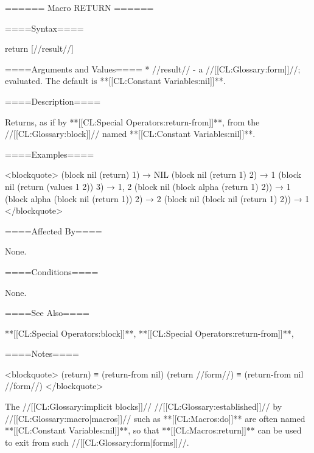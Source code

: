 ====== Macro RETURN ======

====Syntax====

\DefmacNoReturn return {[//result//]}

====Arguments and Values====
  * //result// - a //[[CL:Glossary:form]]//; evaluated. The default is **[[CL:Constant Variables:nil]]**.

====Description====

Returns, as if by **[[CL:Special Operators:return-from]]**, from the //[[CL:Glossary:block]]// named **[[CL:Constant Variables:nil]]**.

====Examples====

<blockquote> (block nil (return) 1) → NIL (block nil (return 1) 2) → 1 (block nil (return (values 1 2)) 3) → 1, 2 (block nil (block alpha (return 1) 2)) → 1 (block alpha (block nil (return 1)) 2) → 2 (block nil (block nil (return 1) 2)) → 1 </blockquote>

====Affected By====

None.

====Conditions====

None.

====See Also====

**[[CL:Special Operators:block]]**, **[[CL:Special Operators:return-from]]**, {\secref\Evaluation}

====Notes====

<blockquote> (return) ≡ (return-from nil) (return //form//) ≡ (return-from nil //form//) </blockquote>

The //[[CL:Glossary:implicit blocks]]// //[[CL:Glossary:established]]// by //[[CL:Glossary:macro|macros]]// such as **[[CL:Macros:do]]** are often named **[[CL:Constant Variables:nil]]**, so that **[[CL:Macros:return]]** can be used to exit from such //[[CL:Glossary:form|forms]]//.

